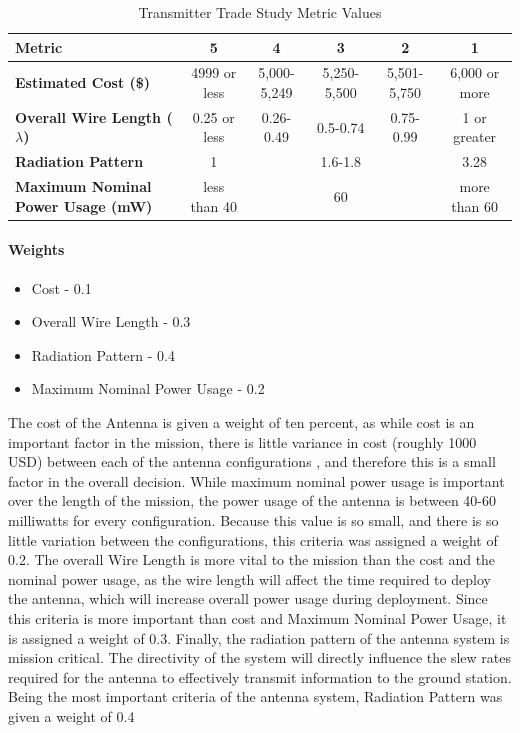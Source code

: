 \begin{table}[H]
\centering
\begin{tabular}{|p{3.5cm}|c|c|c|c|c|}
\hline
    \textbf{Metric} & \textbf{5} & \textbf{4} & \textbf{3} & \textbf{2} & \textbf{1}
    \\
\hline
    \textbf{Estimated Cost (\$)} & 4999 or less & 5,000-5,249 & 5,250-5,500 & 5,501-5,750 & 6,000 or more
    \\
\hline
    \textbf{Overall Wire Length ($\lambda$)} & 0.25 or less & 0.26-0.49  & 0.5-0.74 & 0.75-0.99 & 1 or greater
    \\
\hline
    \textbf{Radiation Pattern} & 1 &  & 1.6-1.8 &  & 3.28
    \\
\hline
    \textbf{Maximum Nominal Power Usage (mW)} & less than 40 &  & 60 &  & more than 60
    \\
\hline
\end{tabular}
\caption{Transmitter Trade Study Metric Values}
\label{tbl:Antenna_Metric_Scores}
\end{table}

\paragraph{Weights}
\begin{itemize}
    \item Cost - 0.1
    \item Overall Wire Length - 0.3
    \item Radiation Pattern - 0.4
    \item Maximum Nominal Power Usage - 0.2
\end{itemize}

The cost of the Antenna is given a weight of ten percent, as while cost is an important factor in the mission, there is little variance in cost (roughly 1000 USD) between each of the antenna configurations \cite{shop}, and therefore this is a small factor in the overall decision. While maximum nominal power usage is important over the length of the mission, the power usage of the antenna is between 40-60 milliwatts for every configuration. Because this value is so small, and there is so little variation between the configurations, this criteria was assigned a weight of 0.2. The overall Wire Length is more vital to the mission than the cost and the nominal power usage, as the wire length will affect the time required to deploy the antenna, which will increase overall power usage during deployment. Since this criteria is more important than cost and Maximum Nominal Power Usage, it is assigned a weight of 0.3. Finally, the radiation pattern of the antenna system is mission critical. The directivity of the system will directly influence the slew rates required for the antenna to effectively transmit information to the ground station. Being the most important criteria of the antenna system, Radiation Pattern was given a weight of 0.4
